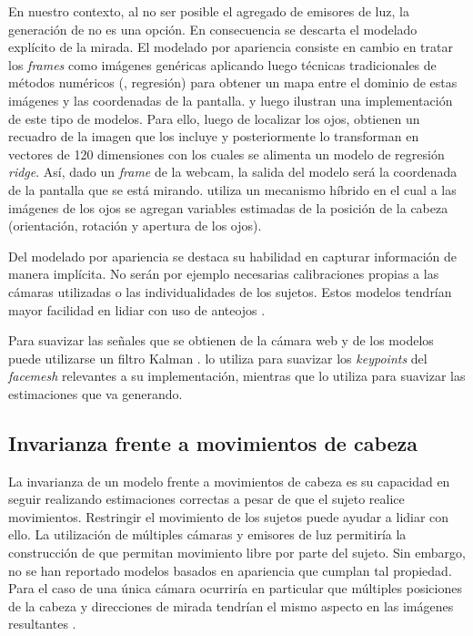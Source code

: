 En nuestro contexto, al no ser posible el agregado de emisores de luz,
la generación de \glints no es una opción.
En consecuencia se descarta el modelado explícito de la mirada.
El modelado por apariencia consiste en cambio en tratar los \textit{frames}
como imágenes genéricas aplicando luego técnicas tradicionales de métodos
numéricos (\eg, regresión) para obtener un mapa entre el dominio de estas
imágenes y las coordenadas de la pantalla.
\turkergaze \cite{xu_2015_turker_gaze} y luego \webgazer
\cite{papoutsaki_2016_webgazer} ilustran una implementación de este tipo de
modelos.
Para ello, luego de localizar los ojos, obtienen un recuadro de la imagen que los incluye y posteriormente lo transforman en vectores de 120 dimensiones con los cuales se alimenta un modelo de regresión
\textit{ridge}.
Así, dado un \textit{frame} de la webcam, la salida del modelo será la
coordenada de la pantalla que se está mirando.
\pace \cite{huang_2016_pace} utiliza un mecanismo híbrido en el cual a las
imágenes de los ojos se agregan variables estimadas de la posición de la cabeza
(orientación, rotación y apertura de los ojos).

Del modelado por apariencia se destaca su habilidad en capturar información de
manera implícita.
No serán por ejemplo necesarias calibraciones propias a las cámaras utilizadas
o las individualidades de los sujetos.
Estos modelos tendrían mayor facilidad en lidiar con uso de anteojos
\cite{hansen_2009_eye_of_the_beholder}.

Para suavizar las señales que se obtienen de la cámara web y de los modelos
puede utilizarse un filtro Kalman \cite{welch_1995_kalman_filter}.
\turkergaze lo utiliza para suavizar los \textit{keypoints} del
\textit{facemesh} relevantes a su implementación, mientras que \webgazer lo
utiliza para suavizar las estimaciones que va generando.

\subsection{Invarianza frente a movimientos de cabeza}

La invarianza de un modelo frente a movimientos de cabeza es su capacidad en
seguir realizando estimaciones correctas a pesar de que el sujeto realice
movimientos.
Restringir el movimiento de los sujetos puede ayudar a lidiar con ello.
La utilización de múltiples cámaras y emisores de luz permitiría la
construcción de \eyetrackers que permitan movimiento libre por parte del
sujeto.
Sin embargo, no se han reportado modelos basados en apariencia que cumplan tal
propiedad.
Para el caso de una única cámara ocurriría en particular que múltiples
posiciones de la cabeza y direcciones de mirada tendrían el mismo aspecto en
las imágenes resultantes \cite{hansen_2009_eye_of_the_beholder}.


